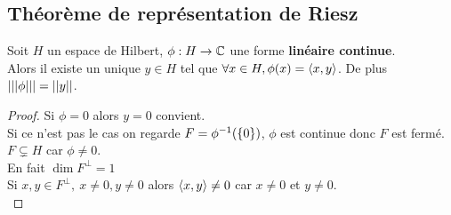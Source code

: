 \subsection{Théorème de représentation de Riesz}

\begin{theorem}
	Soit $H$ un espace de Hilbert, $\phi : H \to \mathbb{C}$ une forme \textbf{linéaire continue}.\\
	Alors il existe un unique $y \in H$ tel que $\forall x \in H, \phi(x) = \left\langle x, y \right\rangle$.
	De plus $\left|\left|\left|\phi\right|\right|\right| = \left|\left|y\right|\right|$.
\end{theorem}


\begin{proof}
	Si $\phi = 0$ alors $y = 0$ convient.\\
	Si ce n'est pas le cas on regarde $F = \phi^{-1}(\left\{0\right\})$, $\phi$ est continue donc $F$ est fermé.\\
	$F \subsetneq H$ car $\phi \neq 0$.\\
	En fait $\dim F^\perp = 1$\\
	Si $x,y \in F^\perp,\ x \neq 0, y \neq 0$ alors $\left\langle x, y \right\rangle \neq 0$ car $x \neq 0$ et $y \neq 0$.\\
\end{proof}


